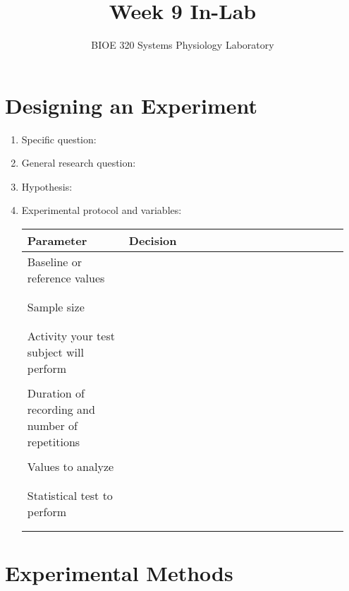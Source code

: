 \documentclass{article}
\title{Week 9 In-Lab}
\author{BIOE 320 Systems Physiology Laboratory}
\date{}
\begin{document}
\large
\maketitle

\section*{Designing an Experiment}

\begin{enumerate}
	\item Specific question:\vspace{2cm}
	\item General research question:\vspace{2cm}
	\item Hypothesis:\vspace{2cm}
	\item Experimental protocol and variables:
	
	\begin{table}[h]
	\centering
	\begin{tabular}[h!]{p{0.3\linewidth}|p{0.65\linewidth}}
	\toprule
	Parameter & Decision\\
	\midrule
	Baseline or reference values & \\\\\\\midrule
	Sample size & \\\\\\\midrule
	Activity your test subject will perform & \\\\\midrule
	Duration of recording and number of repetitions & \\\\\midrule
	Values to analyze & \\\\\\\midrule
	Statistical test to perform & \\\\\\
	\bottomrule
	\end{tabular}
	\end{table}\vspace{3cm}
	
\end{enumerate}


\section*{Experimental Methods}
\end{document}
